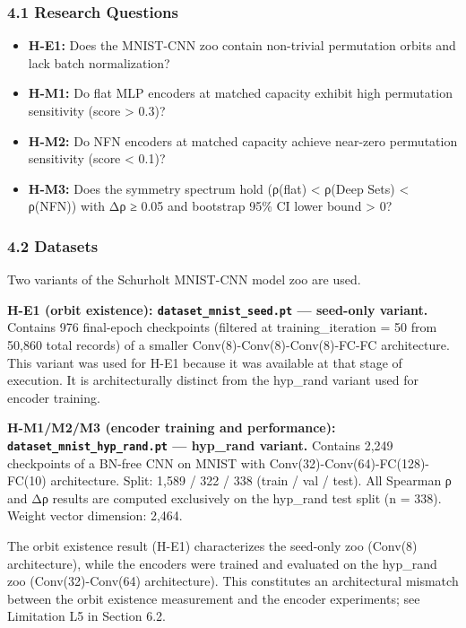 
\subsubsection{4.1 Research Questions}

\begin{itemize}
\item \textbf{H-E1:} Does the MNIST-CNN zoo contain non-trivial permutation orbits and lack batch normalization?
\item \textbf{H-M1:} Do flat MLP encoders at matched capacity exhibit high permutation sensitivity (score > 0.3)?
\item \textbf{H-M2:} Do NFN encoders at matched capacity achieve near-zero permutation sensitivity (score < 0.1)?
\item \textbf{H-M3:} Does the symmetry spectrum hold (ρ(flat) < ρ(Deep Sets) < ρ(NFN)) with Δρ ≥ 0.05 and bootstrap 95\% CI lower bound > 0?
\end{itemize}

\subsubsection{4.2 Datasets}

Two variants of the Schurholt MNIST-CNN model zoo are used.

\textbf{H-E1 (orbit existence): \texttt{dataset_mnist_seed.pt} — seed-only variant.}
Contains 976 final-epoch checkpoints (filtered at training_iteration = 50 from 50,860 total records) of a smaller Conv(8)-Conv(8)-Conv(8)-FC-FC architecture. This variant was used for H-E1 because it was available at that stage of execution. It is architecturally distinct from the hyp_rand variant used for encoder training.

\textbf{H-M1/M2/M3 (encoder training and performance): \texttt{dataset_mnist_hyp_rand.pt} — hyp_rand variant.}
Contains 2,249 checkpoints of a BN-free CNN on MNIST with Conv(32)-Conv(64)-FC(128)-FC(10) architecture. Split: 1,589 / 322 / 338 (train / val / test). All Spearman ρ and Δρ results are computed exclusively on the hyp_rand test split (n = 338). Weight vector dimension: 2,464.

The orbit existence result (H-E1) characterizes the seed-only zoo (Conv(8) architecture), while the encoders were trained and evaluated on the hyp_rand zoo (Conv(32)-Conv(64) architecture). This constitutes an architectural mismatch between the orbit existence measurement and the encoder experiments; see Limitation L5 in Section 6.2.

